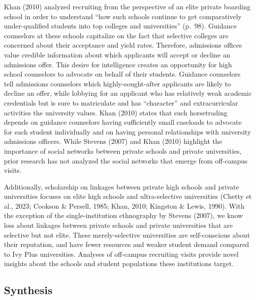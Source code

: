 \documentclass[
  12pt,
]{article}
\begin{document}
Khan (2010) analyzed recruiting from the perspective of an elite private boarding school in order to understand ``how such schools continue to get comparatively under-qualified students into top colleges and universities'' (p.~98). Guidance counselors at these schools capitalize on the fact that selective colleges are concerned about their acceptance and yield rates. Therefore, admissions offices value credible information about which applicants will accept or decline an admissions offer. This desire for intelligence creates an opportunity for high school counselors to advocate on behalf of their students. Guidance counselors tell admissions counselors which highly-sought-after applicants are likely to decline an offer, while lobbying for an applicant who has relatively weak academic credentials but is sure to matriculate and has ``character'' and extracurricular activities the university values. Khan (2010) states that such horsetrading depends on guidance counselors having sufficiently small caseloads to advocate for each student individually and on having personal relationships with university admissions officers. While Stevens (2007) and Khan (2010) highlight the importance of social networks between private schools and private universities, prior research has not analyzed the social networks that emerge from off-campus visits.

Additionally, scholarship on linkages between private high schools and private universities focuses on elite high schools and ultra-selective universities (Chetty et al., 2023; Cookson \& Persell, 1985; Khan, 2010; Kingston \& Lewis, 1990). With the exception of the single-institution ethnography by Stevens (2007), we know less about linkages between private schools and private universities that are selective but not elite. These merely-selective universities are self-conscious about their reputation, and have fewer resources and weaker student demand compared to Ivy Plus universities. Analyses of off-campus recruiting visits provide novel insights about the schools and student populations these institutions target.

\hypertarget{synthesis}{%
\subsection{Synthesis}\label{synthesis}}
\end{document}
